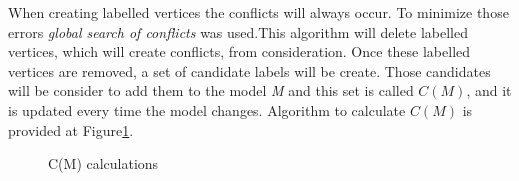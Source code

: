 \documentclass[b5paper,twoside,11pt]{article}
\renewcommand{\figurename}{Figure}
\begin{document}
When creating labelled vertices the conflicts will always occur. To minimize those errors \textit{global search of conflicts} was used.This algorithm will delete labelled vertices, which will create conflicts, from consideration. Once these labelled vertices are removed, a set of candidate labels will be create. Those candidates will be consider to add them to the model \textit{M} and this set is called $C(M)$, and it is updated every time the model changes. Algorithm to calculate $C(M)$ is provided at \figurename\ref{CMCalc}.
\begin{figure}[h]
	\centering

\end{figure}
\begin{figure}[h]
	\centering
	\caption{C(M) calculations}
	\label{CMCalc}
\end{figure}
\end{document}
